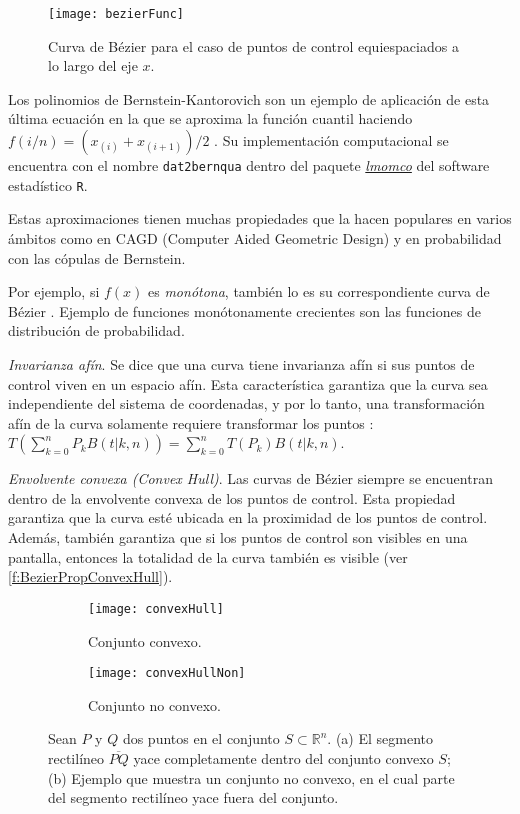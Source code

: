 \begin{figure}[H]
	\centering 
	\texttt{[image: bezierFunc]}
	\caption{Curva de B\'ezier para el caso de puntos de control equiespaciados a lo largo del eje $x$.}
	\label{f:bezierFunc}
\end{figure}

Los polinomios de Bernstein-Kantorovich son un ejemplo de aplicaci\'on de esta \'ultima ecuaci\'on en la que se aproxima la funci\'on cuantil haciendo $f(i/n) = (x_{(i)} + x_{(i+1)})/2$ \citep[p. 392]{munoz-perez_estimating_1987}. Su implementaci\'on computacional se encuentra con el nombre \verb|dat2bernqua| dentro del paquete \href{https://cran.r-project.org/web/packages/lmomco/index.html}{\textit{lmomco}} del software estad\'istico \verb|R|.

Estas aproximaciones tienen muchas propiedades que la hacen populares en varios \'ambitos como en CAGD (Computer Aided Geometric Design) y en probabilidad con las c\'opulas de Bernstein.

Por ejemplo, si $f(x)$ es \textit{mon\'otona}, tambi\'en lo es su correspondiente curva de B\'ezier \citep[Theorem 7.1.2, p. 251]{phillips_interpolation_2003}. Ejemplo de funciones mon\'otonamente crecientes son las funciones de distribuci\'on de probabilidad.

\textit{Invarianza af\'in}. Se dice que una curva tiene invarianza af\'in si sus puntos de control viven en un espacio af\'in. Esta caracter\'istica garantiza que la curva sea independiente del sistema de coordenadas, y por lo tanto, una transformaci\'on af\'in de la curva solamente requiere transformar los puntos : $T(\sum_{k=0}^n P_k B(t|k,n))=\sum_{k=0}^nT(P_k)B(t|k,n)$.

\textit{Envolvente convexa (Convex Hull)}. Las curvas de B\'ezier siempre se encuentran dentro de la envolvente convexa de los puntos de control.
Esta propiedad garantiza que la curva est\'e ubicada en la proximidad de los puntos de control.
Adem\'as, tambi\'en garantiza que si los puntos de control son visibles en una pantalla, entonces la totalidad de la curva tambi\'en es visible (ver \autoref{f:BezierPropConvexHull}).

\begin{figure}[H]
	\centering
	\begin{subfigure}[b]{0.3\textwidth}
		\texttt{[image: convexHull]}
		\caption{Conjunto convexo.}
		\label{fig:convexHull}
	\end{subfigure} \qquad
	\begin{subfigure}[b]{0.3\textwidth}
		\texttt{[image: convexHullNon]}
		\caption{Conjunto no convexo.}
		\label{fig:convexHullNon}
	\end{subfigure}
	\caption{Sean $P$ y $Q$ dos puntos en el conjunto $S \subset \mathbb{R}^n$. (a) El segmento rectil\'ineo $\overline{PQ}$ yace completamente dentro del conjunto convexo $S$; (b) Ejemplo que muestra un conjunto no convexo, en el cual parte del segmento rectil\'ineo yace fuera del conjunto.}
	\label{f:BezierPropConvexHull}
\end{figure}

